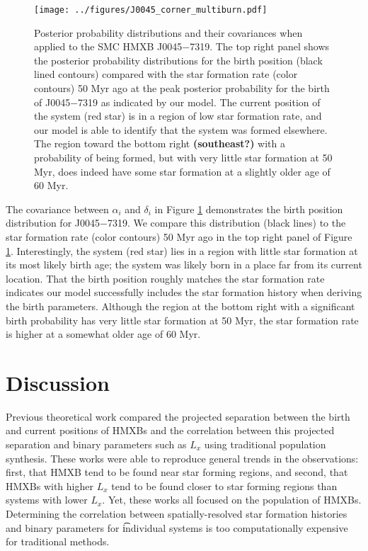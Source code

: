 \documentclass[usenatbib]{mnras}
\begin{document}
\begin{figure}
\begin{center}
\texttt{[image: ../figures/J0045\_corner\_multiburn.pdf]}
\caption{Posterior probability distributions and their covariances when applied to the SMC HMXB J0045$-$7319. The top right panel shows the posterior probability distributions for the birth position (black lined contours) compared with the star formation rate (color contours) 50 Myr ago at the peak posterior probability for the birth of J0045$-$7319 as indicated by our model. The current position of the system (red star) is in a region of low star formation rate, and our model is able to identify that the system was formed elsewhere. The region toward the bottom right {\bf (southeast?)} with a probability of being formed, but with very little star formation at 50 Myr, does indeed have some star formation at a slightly older age of 60 Myr.}
\label{fig:J0045_corner}
\end{center}
\end{figure}

The covariance between $\alpha_i$ and $\delta_i$ in Figure \ref{fig:J0045_corner} demonstrates the birth position distribution for J0045$-$7319. We compare this distribution (black lines) to the star formation rate (color contours) 50 Myr ago in the top right panel of Figure \ref{fig:J0045_corner}. Interestingly, the system (red star) lies in a region with little star formation at its most likely birth age; the system was likely born in a place far from its current location. That the birth position roughly matches the star formation rate indicates our model successfully includes the star formation history when deriving the birth parameters. Although the region at the bottom right with a significant birth probability has very little star formation at 50 Myr, the star formation rate is higher at a somewhat older age of 60 Myr.





\section{Discussion}

Previous theoretical work compared the projected separation between the birth and current positions of HMXBs \citet{sepinsky05} and the correlation between this projected separation and binary parameters such as $L_x$ \citet{zuo10,zuo15} using traditional population synthesis. These works were able to reproduce general trends in the observations: first, that HMXB tend to be found near star forming regions, and second, that HMXBs with higher $L_x$ tend to be found closer to star forming regions than systems with lower $L_x$. Yet, these works all focused on the population of HMXBs. Determining the correlation between spatially-resolved star formation histories and binary parameters for {\t individual} systems is too computationally expensive for traditional methods.
\end{document}
